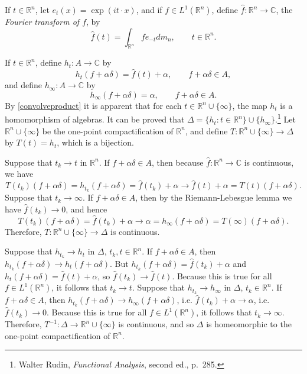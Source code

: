 \documentclass{article}
\theoremstyle{definition}
\theoremstyle{definition}
\begin{document}
If $t \in \mathbb{R}^n$, let $e_t(x) = \exp(it\cdot x)$, and if $f \in L^1(\mathbb{R}^n)$, define $\hat{f}:\mathbb{R}^n \to \mathbb{C}$, 
the {\em Fourier transform of $f$}, by
\[
\hat{f}(t) = \int_{\mathbb{R}^n} fe_{-t} dm_n, \qquad t \in \mathbb{R}^n.
\]

If $t \in \mathbb{R}^n$, define $h_t:A \to \mathbb{C}$ by 
\[
h_t(f+\alpha \delta) = \hat{f}(t)+\alpha, \qquad f+\alpha \delta \in A,
\]
and  define $h_\infty:A \to \mathbb{C}$ by
\[
h_\infty(f+\alpha \delta)=\alpha, \qquad f+\alpha \delta \in A.
\]
By \eqref{convolveproduct} it is apparent that  for each $t \in \mathbb{R}^n \cup \{\infty\}$, the map $h_t$ is a homomorphism of algebras.
It can be proved that $\Delta=\{h_t: t \in \mathbb{R}^n\} \cup \{h_\infty\}$.\footnote{Walter
Rudin, {\em Functional Analysis}, second ed., p.~285.}
Let $\mathbb{R}^n \cup \{\infty\}$  be the one-point compactification of $\mathbb{R}^n$, and
define $T:\mathbb{R}^n \cup \{\infty\} \to \Delta$ by $T(t)=h_t$, which is  a bijection.

Suppose that $t_k \to t$ in $\mathbb{R}^n$. If $f+\alpha \delta \in A$, then because
 $\hat{f}:\mathbb{R}^n \to \mathbb{C}$ is continuous, we have
 \[
 T(t_k)(f+\alpha \delta) = h_{t_k}(f+\alpha \delta) = \hat{f}(t_k)+\alpha \to \hat{f}(t)+\alpha = T(t)(f+\alpha \delta).
 \]
 Suppose that $t_k \to \infty$. If $f+\alpha \delta \in A$, then by the Riemann-Lebesgue lemma we have $\hat{f}(t_k) \to 0$, and hence
 \[
 T(t_k)(f+\alpha \delta) =  \hat{f}(t_k) + \alpha \to \alpha = h_\infty(f+\alpha \delta) = T(\infty)(f+\alpha \delta).
 \]
Therefore, $T:\mathbb{R}^n \cup \{\infty\} \to \Delta$ is continuous. 

Suppose that $h_{t_k} \to h_t$ in $\Delta$, $t_k, t \in \mathbb{R}^n$. If $f+\alpha \delta \in A$, then
$h_{t_k}(f+\alpha \delta) \to h_t(f+\alpha \delta)$. But $h_{t_k}(f+\alpha \delta)=\hat{f}(t_k) + \alpha$
and $h_t(f+\alpha \delta)=\hat{f}(t)+\alpha$, so $\hat{f}(t_k) \to \hat{f}(t)$. Because this is true for all $f \in L^1(\mathbb{R}^n)$, it follows that
$t_k \to t$.
Suppose that $h_{t_k} \to h_\infty$ in $\Delta$, $t_k \in \mathbb{R}^n$. If $f+\alpha \delta \in A$, then
$h_{t_k}(f+\alpha \delta) \to h_\infty(f+\alpha \delta)$, i.e.
$\hat{f}(t_k)+\alpha \to \alpha$, i.e. $\hat{f}(t_k) \to 0$. Because this is true for all $f \in L^1(\mathbb{R}^n)$, it follows that $t_k \to \infty$.
Therefore, $T^{-1}:\Delta \to \mathbb{R}^n \cup \{\infty\}$ is continuous, and so $\Delta$ is homeomorphic
to the one-point compactification of $\mathbb{R}^n$.
\end{document}
